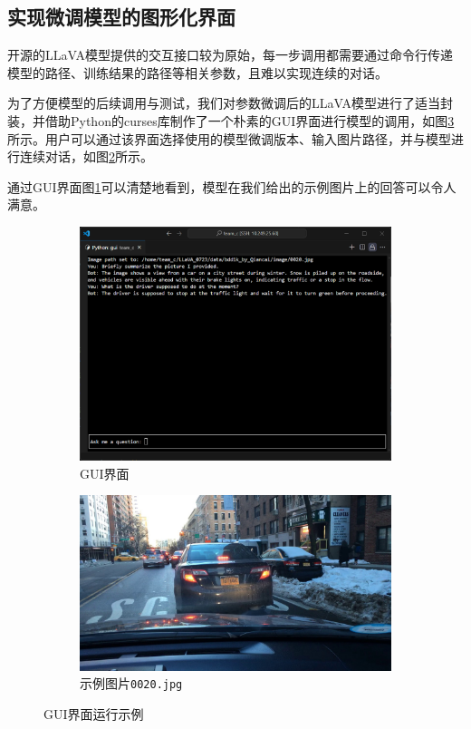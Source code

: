 \documentclass[
    linespread = 1.25
]{ctexart}
\begin{document}
\subsection{实现微调模型的图形化界面}
开源的LLaVA模型提供的交互接口较为原始，每一步调用都需要通过命令行传递模型的路径、训练结果的路径等相关参数，且难以实现连续的对话。

为了方便模型的后续调用与测试，我们对参数微调后的LLaVA模型进行了适当封装，并借助Python的curses库制作了一个朴素的GUI界面进行模型的调用，如图\ref{fig:gui_result}所示。用户可以通过该界面选择使用的模型微调版本、输入图片路径，并与模型进行连续对话，如图\ref{fig:result}所示。

通过GUI界面图\ref{fig:gui}可以清楚地看到，模型在我们给出的示例图片上的回答可以令人满意。
\begin{figure}[htbp]
  \centering
  \begin{subfigure}{0.6\textwidth}
    \centering
    \includegraphics[width=\textwidth]{gui.png}
    \caption{GUI界面}
    \label{fig:gui}
  \end{subfigure}
  \hfill
  \begin{subfigure}{0.36\textwidth}
    \includegraphics[width=\textwidth]{0020.jpg}
    \caption{示例图片\texttt{0020.jpg}}
    \label{fig:result}
  \end{subfigure}
  \caption{GUI界面运行示例}
  \label{fig:gui_result}
\end{figure}
\end{document}
